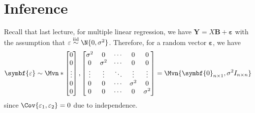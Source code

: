 \section{Inference}
Recall that last lecture, for multiple linear regression,
we have $ \symbf{Y}=X\symbf{B}+\symbf{\varepsilon} $
with the assumption that $ \varepsilon\stackrel{\text{iid}}{\sim}\N{0,\sigma^2} $.
Therefore, for a random vector $ \symbf{\varepsilon} $, we have
\[ \symbf{\varepsilon}\sim\Mvn*{
        \begin{bmatrix}
            0      \\
            0      \\
            \vdots \\
            0      \\
            0
        \end{bmatrix},
        \begin{bmatrix}
            \sigma^2 & 0        & \cdots & 0        & 0        \\
            0        & \sigma^2 & \cdots & 0        & 0        \\
            \vdots   & \vdots   & \ddots & \vdots   & \vdots   \\
            0        & 0        & \cdots & \sigma^2 & 0        \\
            0        & 0        & \cdots & 0        & \sigma^2 \\
        \end{bmatrix}}=
    \Mvn{\symbf{0}_{n\times 1},\sigma^2I_{n\times n}} \]
since $ \Cov{\varepsilon_1,\varepsilon_2}=0 $ due to independence.

